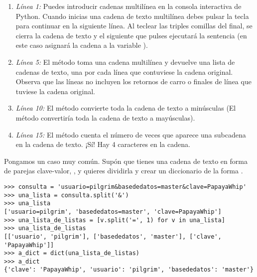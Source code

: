 \begin{enumerate}

\item \emph{Línea 1:} Puedes introducir cadenas multilínea en la consola interactiva de Python. Cuando inicias una cadena de texto multilínea debes pulsar la tecla  para continuar en la siguiente línea. Al teclear las triples comillas del final, se cierra la cadena de texto y el siguiente  que pulses ejecutará la sentencia (en este caso asignará la cadena a la variable ).

\item \emph{Línea 5:} El método  toma una cadena multilínea y devuelve una lista de cadenas de texto, una por cada línea que contuviese la cadena original. Observa que las líneas no incluyen los retornos de carro o finales de línea que tuviese la cadena original.

\item \emph{Línea 10:} El método  convierte toda la cadena de texto a minúsculas (El método  convertiría toda la cadena de texto a mayúsculas).

\item \emph{Línea 15:} El método  cuenta el número de veces que aparece una subcadena en la cadena de texto. ¡Sí! Hay 4 caracteres  en la cadena.

\end{enumerate}

Pongamos un caso muy común. Supón que tienes una cadena de texto en forma de parejas clave-valor, , y quieres dividirla y crear un diccionario de la forma .

\noindent\begin{minipage}{\textwidth}
\begin{lstlisting}[mathescape=True]
>>> consulta = 'usuario=pilgrim&basededatos=master&clave=PapayaWhip'
>>> una_lista = consulta.split('&')
>>> una_lista
['usuario=pilgrim', 'basededatos=master', 'clave=PapayaWhip']
>>> una_lista_de_listas = [v.split('=', 1) for v in una_lista]
>>> una_lista_de_listas
[['usuario', 'pilgrim'], ['basededatos', 'master'], ['clave', 'PapayaWhip']]
>>> a_dict = dict(una_lista_de_listas)
>>> a_dict
{'clave': 'PapayaWhip', 'usuario': 'pilgrim', 'basededatos': 'master'}
\end{lstlisting}
\end{minipage}
 
